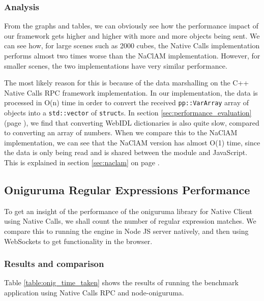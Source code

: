\subsubsection{Analysis} %
\label{ssub:bullet_physics_performanceanalysis}
From the graphs and tables, we can obviously see how the performance impact of our framework gets higher and higher with more and more objects being sent. We can see how, for large scenes such as 2000 cubes, the Native Calls implementation performs almost two times worse than the NaClAM implementation. However, for smaller scenes, the two implementations have very similar performance.

The most likely reason for this is because of the data marshalling on the C++ Native Calls RPC framework implementation. In our implementation, the data is processed in O(n) time in order to convert the received \lstinline{pp::VarArray} array of objects into a \lstinline{std::vector} of \lstinline{struct}s. In section \ref{sec:performance_evaluation} (page \pageref{sec:performance_evaluation}), we find that converting WebIDL dictionaries is also quite slow, compared to converting an array of numbers. When we compare this to the NaClAM implementation, we can see that the NaClAM version has almost O(1) time, since the data is only being read and is shared between the module and JavaScript. This is explained in section \ref{sec:naclam} on page \pageref{sec:naclam}.



\subsection{Oniguruma Regular Expressions Performance} %
\label{sub:oniguruma_regular_expressions_performance}
To get an insight of the performance of the oniguruma library for Native Client using Native Calls, we shall count the number of regular expression matches. We compare this to running the engine in Node JS server natively, and then using WebSockets to get functionality in the browser.

\subsubsection{Results and comparison} %
\label{ssub:onig_results_and_comparison}
Table \ref{table:onig_time_taken} shows the results of running the benchmark application using Native Calls RPC and node-oniguruma.

